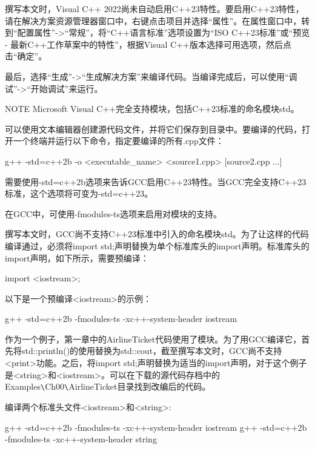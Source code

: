 撰写本文时，Visual C++ 2022尚未自动启用C++23特性。要启用C++23特性，请在解决方案资源管理器窗口中，右键点击项目并选择“属性”。在属性窗口中，转到“配置属性”->“常规”，将“C++语言标准”选项设置为“ISO C++23标准”或“预览 - 最新C++工作草案中的特性”，根据Visual C++版本选择可用选项，然后点击“确定”。

最后，选择“生成”->“生成解决方案”来编译代码。当编译完成后，可以使用“调试”->“开始调试”来运行。

\begin{myNotic}{NOTE}
Microsoft Visual C++完全支持模块，包括C++23标准的命名模块std。
\end{myNotic}


可以使用文本编辑器创建源代码文件，并将它们保存到目录中。要编译的代码，打开一个终端并运行以下命令，指定要编译的所有.cpp文件：

\begin{shell}
g++ -std=c++2b -o <executable_name> <source1.cpp> [source2.cpp ...]
\end{shell}

需要使用-std=c++2b选项来告诉GCC启用C++23特性。当GCC完全支持C++23标准，这个选项将可变为-std=c++23。


在GCC中，可使用-fmodules-ts选项来启用对模块的支持。

撰写本文时，GCC尚不支持C++23标准中引入的命名模块std。为了让这样的代码编译通过，必须将import std;声明替换为单个标准库头的import声明。标准库头的import声明，如下所示，需要预编译：

\begin{cpp}
import <iostream>;
\end{cpp}

以下是一个预编译<iostream>的示例：

\begin{shell}
g++ -std=c++2b -fmodules-ts -xc++-system-header iostream
\end{shell}

作为一个例子，第一章中的AirlineTicket代码使用了模块。为了用GCC编译它，首先将std::println()的使用替换为std::cout，截至撰写本文时，GCC尚不支持<print>功能。之后，将import std;声明替换为适当的import声明，对于这个例子是<string>和<iostream>。可以在下载的源代码存档中的Examples\verb|\|Ch00\verb|\|AirlineTicket目录找到改编后的代码。

编译两个标准头文件<iostream>和<string>:

\begin{shell}
g++ -std=c++2b -fmodules-ts -xc++-system-header iostream
g++ -std=c++2b -fmodules-ts -xc++-system-header string
\end{shell}

